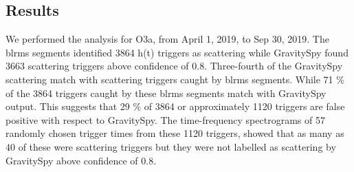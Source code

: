 \documentclass[12pt]{iopart}
\begin{document}
\subsection{Results}


\par
We performed the analysis for O3a, from April 1, 2019, to Sep 30, 2019. The blrms segments identified 3864 h(t) triggers as scattering while GravitySpy found 3663 scattering triggers above confidence of 0.8.  Three-fourth of the GravitySpy scattering match with scattering triggers caught by blrms segments. While 71 $\%$ of the 3864 triggers caught by these blrms segments match with GravitySpy output. This suggests that 29 $\%$ of 3864 or approximately 1120 triggers are false positive with respect to GravitySpy. 
The time-frequency spectrograms of 57 randomly chosen trigger times from these 1120 triggers, showed that as many as 40 of these were scattering triggers but they were not labelled as scattering by GravitySpy above confidence of 0.8. 
\end{document}
